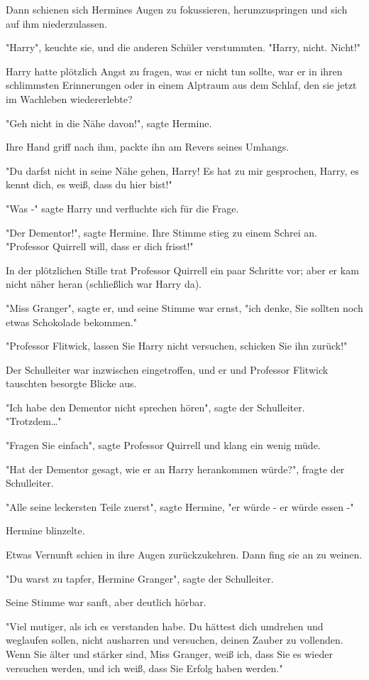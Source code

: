 {Dann schienen sich Hermines Augen zu fokussieren, herumzuspringen und sich auf ihm niederzulassen.

"Harry", keuchte sie, und die anderen Schüler verstummten. "Harry, nicht. Nicht!"

Harry hatte plötzlich Angst zu fragen, was er nicht tun sollte, war er in ihren schlimmsten Erinnerungen oder in einem Alptraum aus dem Schlaf, den sie jetzt im Wachleben wiedererlebte?

"Geh nicht in die Nähe davon!", sagte Hermine.

Ihre Hand griff nach ihm, packte ihn am Revers seines Umhangs.

"Du darfst nicht in seine Nähe gehen, Harry! Es hat zu mir gesprochen, Harry, es kennt dich, es weiß, dass du hier bist!"

"Was -" sagte Harry und verfluchte sich für die Frage.

"Der Dementor!", sagte Hermine. Ihre Stimme stieg zu einem Schrei an. "Professor Quirrell will, dass er dich frisst!"

In der plötzlichen Stille trat Professor Quirrell ein paar Schritte vor; aber er kam nicht näher heran (schließlich war Harry da).

"Miss Granger", sagte er, und seine Stimme war ernst, "ich denke, Sie sollten noch etwas Schokolade bekommen."

"Professor Flitwick, lassen Sie Harry nicht versuchen, schicken Sie ihn zurück!"

Der Schulleiter war inzwischen eingetroffen, und er und Professor Flitwick tauschten besorgte Blicke aus.

"Ich habe den Dementor nicht sprechen hören", sagte der Schulleiter. "Trotzdem…"

"Fragen Sie einfach", sagte Professor Quirrell und klang ein wenig müde.

"Hat der Dementor gesagt, wie er an Harry herankommen würde?", fragte der Schulleiter.

"Alle seine leckersten Teile zuerst", sagte Hermine, "er würde - er würde essen -"

Hermine blinzelte.

Etwas Vernunft schien in ihre Augen zurückzukehren. Dann fing sie an zu weinen.

"Du warst zu tapfer, Hermine Granger", sagte der Schulleiter.

Seine Stimme war sanft, aber deutlich hörbar.

"Viel mutiger, als ich es verstanden habe. Du hättest dich umdrehen und weglaufen sollen, nicht ausharren und versuchen, deinen Zauber zu vollenden. Wenn Sie älter und stärker sind, Miss Granger, weiß ich, dass Sie es wieder versuchen werden, und ich weiß, dass Sie Erfolg haben werden."

}
